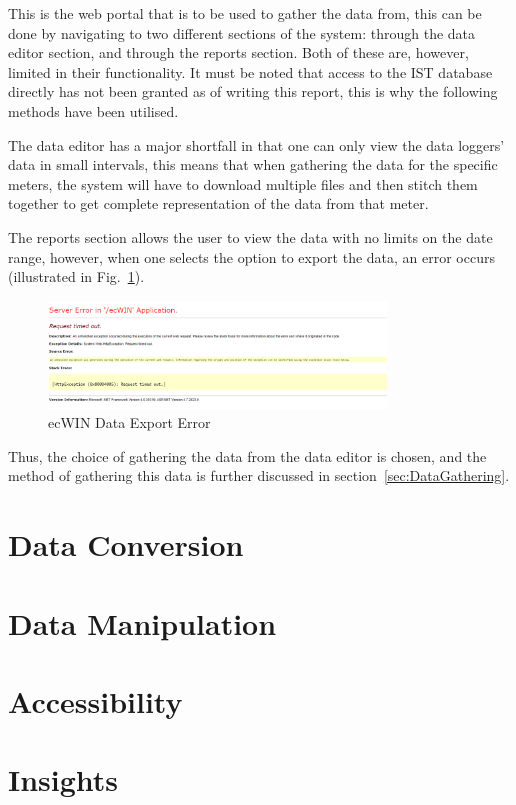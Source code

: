 \documentclass[12pt,onecolumn]{IEEEtran}
\begin{document}
This is the web portal that is to be used to gather the data from, this can be done by navigating to two different sections of the system: through the data editor section, and through the reports section. Both of these are, however, limited in their functionality. It must be noted that access to the IST database directly has not been granted as of writing this report, this is why the following methods have been utilised.

The data editor has a major shortfall in that one can only view the data loggers' data in small intervals, this means that when gathering the data for the specific meters, the system will have to download multiple files and then stitch them together to get complete representation of the data from that meter.

The reports section allows the user to view the data with no limits on the date range, however, when one selects the option to export the data, an error occurs (illustrated in Fig.~\ref{fig:ecwinerror}). 

\begin{center}
    \begin{figure}[htb]
        \centering
        \includegraphics[width=0.8\textwidth]{ecwinerror.png}
        \caption{ecWIN Data Export Error}
        \label{fig:ecwinerror}
    \end{figure}
\end{center}

Thus, the choice of gathering the data from the data editor is chosen, and the method of gathering this data is further discussed in section~\ref{sec:DataGathering}.


\section{Data Conversion} \label{sec:DataConversion}

\section{Data Manipulation} \label{sec:DataManipulation}

\section{Accessibility} \label{sec:Accessibility}

\section{Insights} \label{sec:Insights}


\cite{datasite}



\end{document}
